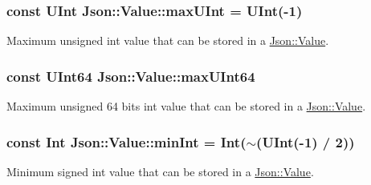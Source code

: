 \subsubsection[{\texorpdfstring{max\+U\+Int}{maxUInt}}]{\setlength{\rightskip}{0pt plus 5cm}const {\bf U\+Int} Json\+::\+Value\+::max\+U\+Int = {\bf U\+Int}(-\/1)\hspace{0.3cm}{\ttfamily [static]}}\hypertarget{classJson_1_1Value_ac79e63ee68d3aa914bfd6988be669b87}{}\label{classJson_1_1Value_ac79e63ee68d3aa914bfd6988be669b87}


Maximum unsigned int value that can be stored in a \hyperlink{classJson_1_1Value}{Json\+::\+Value}. 

\subsubsection[{\texorpdfstring{max\+U\+Int64}{maxUInt64}}]{\setlength{\rightskip}{0pt plus 5cm}const {\bf U\+Int64} Json\+::\+Value\+::max\+U\+Int64\hspace{0.3cm}{\ttfamily [static]}}\hypertarget{classJson_1_1Value_ae1eb89c305c39516696ff305cffa01da}{}\label{classJson_1_1Value_ae1eb89c305c39516696ff305cffa01da}


Maximum unsigned 64 bits int value that can be stored in a \hyperlink{classJson_1_1Value}{Json\+::\+Value}. 

\subsubsection[{\texorpdfstring{min\+Int}{minInt}}]{\setlength{\rightskip}{0pt plus 5cm}const {\bf Int} Json\+::\+Value\+::min\+Int = {\bf Int}($\sim$({\bf U\+Int}(-\/1) / 2))\hspace{0.3cm}{\ttfamily [static]}}\hypertarget{classJson_1_1Value_a7df8a39e2502b8c92a6a41e3d752d2c8}{}\label{classJson_1_1Value_a7df8a39e2502b8c92a6a41e3d752d2c8}


Minimum signed int value that can be stored in a \hyperlink{classJson_1_1Value}{Json\+::\+Value}. 

